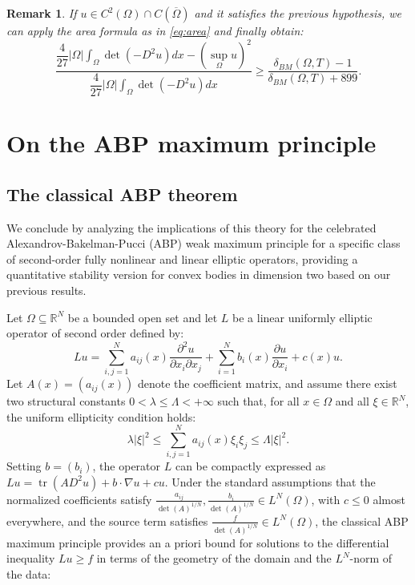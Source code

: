 \documentclass{article}
\newtheorem{remark}[theorem]{Remark}
\numberwithin{equation}{section}
\begin{document}
\begin{remark}
 If $u \in C^{2}(\Omega)\cap C(\overline{\Omega})$ and it satisfies the previous hypothesis, we can apply the area formula as in \eqref{eq:area} and finally obtain:
     \begin{equation}\label{eq:quant}
     \dfrac{\dfrac{4}{27}|\Omega|\displaystyle\int_\Omega\det (-D^2u)dx-(\sup_\Omega u)^2}{\dfrac{4}{27}|\Omega|\displaystyle\int_\Omega\det (-D^2u)dx}\geq \dfrac{\delta_{BM}(\Omega, T)-1}{\delta_{BM}(\Omega,T)+899}.
     \end{equation}
     
\end{remark}
\section{On the ABP maximum principle}

\subsection{The classical ABP theorem}

We conclude by analyzing the implications of this theory for the celebrated Alexandrov-Bakelman-Pucci (ABP) weak maximum principle for a specific class of second-order fully nonlinear and linear elliptic operators, providing a quantitative stability version for convex bodies in dimension two based on our previous results.

\noindent Let $\Omega \subseteq \mathbb{R}^N$ be a bounded open set and let $L$ be a linear uniformly elliptic operator of second order defined by:
\[
Lu = \sum_{i,j=1}^N a_{ij}(x) \frac{\partial^2 u}{\partial x_i \partial x_j} + \sum_{i=1}^N b_i(x) \frac{\partial u}{\partial x_i} + c(x)u.
\]
Let $A(x) = (a_{ij}(x))$ denote the coefficient matrix, and assume there exist two structural constants $0 < \lambda \le \Lambda < +\infty$ such that, for all $x \in \Omega$ and all $\xi \in \mathbb{R}^N$, the uniform ellipticity condition holds:
\[
\lambda|\xi|^2 \le \sum_{i,j=1}^N a_{ij}(x)\xi_i\xi_j \le \Lambda|\xi|^2.
\]
Setting $b = (b_i)$, the operator $L$ can be compactly expressed as $Lu = \operatorname{tr}(AD^2u) + b \cdot \nabla u + cu$. Under the standard assumptions that the normalized coefficients satisfy $\frac{a_{ij}}{\det(A)^{1/N}}, \frac{b_i}{\det(A)^{1/N}} \in L^N(\Omega)$, with $c \le 0$ almost everywhere, and the source term satisfies $\frac{f}{\det(A)^{1/N}} \in L^N(\Omega)$, the classical ABP maximum principle provides an a priori bound for solutions to the differential inequality $Lu \ge f$ in terms of the geometry of the domain and the $L^N$-norm of the data:
\end{document}
